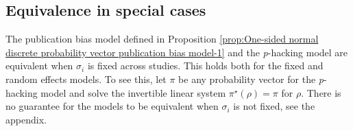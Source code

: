 \documentclass{article}
\theoremstyle{plain}
\theoremstyle{definition}
\newtheorem{example}[theorem]{\protect\examplename}
\providecommand{\examplename}{Example}
\renewcommand{\sqrt}[1]{(#1)^{1/2}}
\begin{document}
\subsection{Equivalence in special cases}
The publication bias model defined in Proposition \ref{prop:One-sided normal discrete probability vector publication bias model-1} and the \textit{p}-hacking model are equivalent when $\sigma_{i}$ is fixed across studies. This holds both for the fixed and random effects models. To see this, let $\pi$ be any probability vector for the \textit{p}-hacking model and solve the invertible linear system $\pi^{\star}(\rho)=\pi$ for $\rho$. There is no guarantee for the models to be equivalent when $\sigma_{i}$ is not fixed, see the appendix.

%
%
%
%
%
\end{document}
